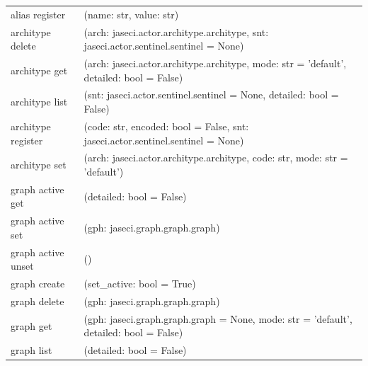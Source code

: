{\begin{longtable}{l p{10cm}}
        alias register                      & (name: str, value: str)                                                                                               \\
        architype delete                    & (arch: jaseci.actor.architype.architype, snt: jaseci.actor.sentinel.sentinel = None)                                  \\
        architype get                       & (arch: jaseci.actor.architype.architype, mode: str = 'default', detailed: bool = False)                               \\
        architype list                      & (snt: jaseci.actor.sentinel.sentinel = None, detailed: bool = False)                                                  \\
        architype register                  & (code: str, encoded: bool = False, snt: jaseci.actor.sentinel.sentinel = None)                                        \\
        architype set                       & (arch: jaseci.actor.architype.architype, code: str, mode: str = 'default')                                            \\
        graph active get                    & (detailed: bool = False)                                                                                              \\
        graph active set                    & (gph: jaseci.graph.graph.graph)                                                                                       \\
        graph active unset                  & ()                                                                                                                    \\
        graph create                        & (set\_active: bool = True)                                                                                            \\
        graph delete                        & (gph: jaseci.graph.graph.graph)                                                                                       \\
        graph get                           & (gph: jaseci.graph.graph.graph = None, mode: str = 'default', detailed: bool = False)                                 \\
        graph list                          & (detailed: bool = False)                                                                                              \\

\end{longtable}}
